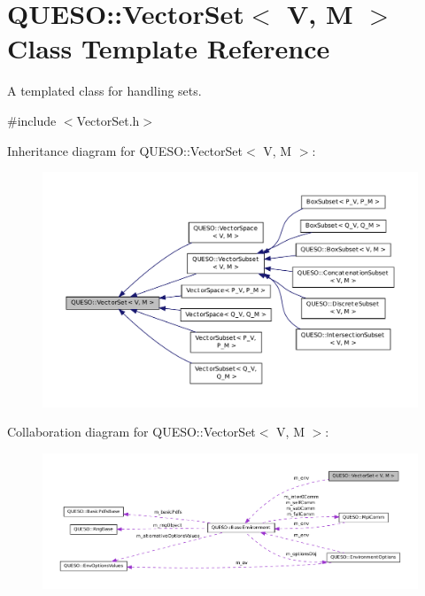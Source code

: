 \hypertarget{class_q_u_e_s_o_1_1_vector_set}{\section{Q\-U\-E\-S\-O\-:\-:Vector\-Set$<$ V, M $>$ Class Template Reference}
\label{class_q_u_e_s_o_1_1_vector_set}
}


A templated class for handling sets.  




{\ttfamily \#include $<$Vector\-Set.\-h$>$}



Inheritance diagram for Q\-U\-E\-S\-O\-:\-:Vector\-Set$<$ V, M $>$\-:
\nopagebreak
\begin{figure}[H]
\begin{center}
\leavevmode
\includegraphics[width=350pt]{class_q_u_e_s_o_1_1_vector_set__inherit__graph}
\end{center}
\end{figure}


Collaboration diagram for Q\-U\-E\-S\-O\-:\-:Vector\-Set$<$ V, M $>$\-:
\nopagebreak
\begin{figure}[H]
\begin{center}
\leavevmode
\includegraphics[width=350pt]{class_q_u_e_s_o_1_1_vector_set__coll__graph}
\end{center}
\end{figure}
